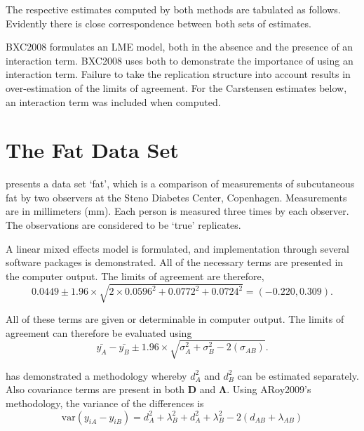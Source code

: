 \documentclass[12pt, a4paper]{report}
\theoremstyle{plain}
\theoremstyle{definition}
\theoremstyle{remark}
\begin{document}
	
	
	The respective estimates computed by both methods are tabulated as follows. Evidently there is close correspondence between both sets of estimates.
	
	BXC2008 formulates an LME model, both in the absence and the presence of an interaction term. BXC2008 uses both to demonstrate the importance of using an interaction term. Failure to take the replication structure into
	account results in over-estimation of the limits of agreement. 
	For the Carstensen estimates below, an interaction term was included when computed.
	
	
	
	
	
	
	\section{The Fat Data Set}
	
	\citet{BXC2008} presents a data set `fat', which is a comparison of measurements of subcutaneous fat
	by two observers at the Steno Diabetes Center, Copenhagen. Measurements are in millimeters
	(mm). Each person is measured three times by each observer. The observations are considered to be `true' replicates.
	
	
	A linear mixed effects model is formulated, and implementation through several software packages is demonstrated.
	All of the necessary terms are presented in the computer output. The limits of agreement are therefore,
	\begin{equation}
	0.0449  \pm 1.96 \times  \sqrt{2 \times 0.0596^2 + 0.0772^2 + 0.0724^2} = (-0.220,  0.309).
	\end{equation}
	
	All of these terms are given or determinable in computer output. The limits of agreement can therefore be evaluated using
	\begin{equation}
	\bar{y_{A}}-\bar{y_{B}} \pm 1.96 \times \sqrt{ \sigma^2_{A} + \sigma^2_{B}  - 2(\sigma_{AB})}.
	\end{equation}
	
	
	
	\citet{AARoy20092009} has demonstrated a methodology whereby $d^2_{A}$ and $d^2_{B}$ can be estimated separately. Also covariance terms are present in both $\boldsymbol{D}$ and $\boldsymbol{\Lambda}$. Using ARoy2009's methodology, the variance of the differences is
	\begin{equation}
	\mbox{var} (y_{iA}-y_{iB})= d^2_{A} + \lambda^2_{B} + d^2_{A} + \lambda^2_{B} - 2(d_{AB} + \lambda_{AB})
	\end{equation}
	
\end{document}
